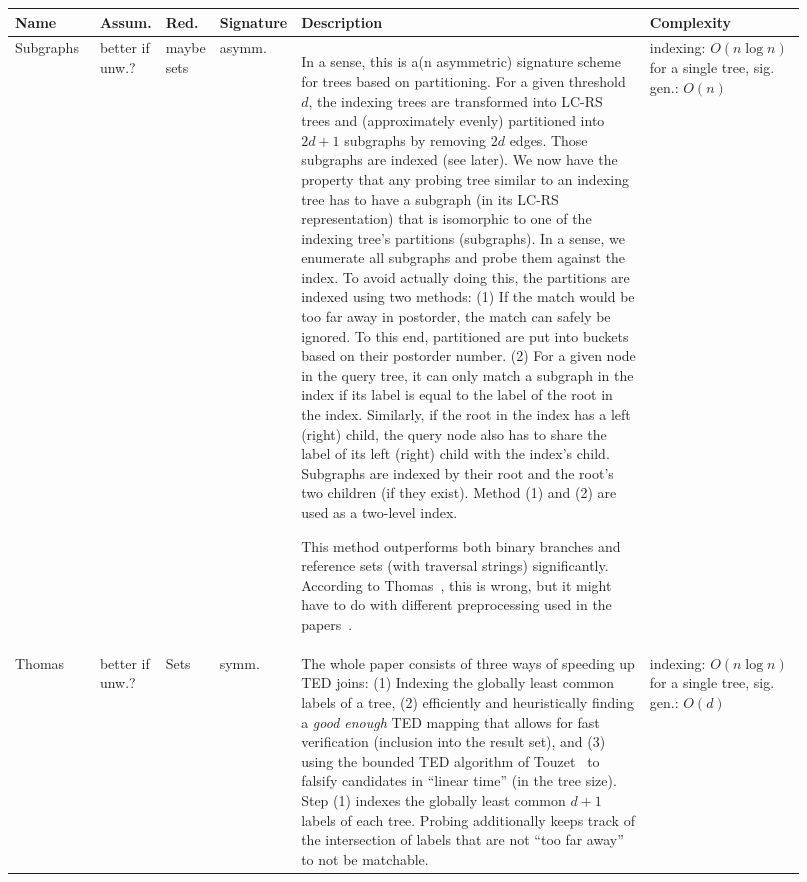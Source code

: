 \documentclass{article}
\begin{document}
\begin{footnotesize}
    \begin{longtable}[c]{p{0.1\linewidth}p{0.075\linewidth}p{0.05\linewidth}p{0.05\linewidth}p{0.45\linewidth}p{0.2\linewidth}}
        \toprule
        Name    &   Assum.  & Red.  &   Signature   &   Description  &   Complexity   \tabularnewline
        \midrule\endhead
        Subgraphs~\cite{DBLP:journals/pvldb/TangCM15}&
        better if unw.?&
        maybe sets&
        asymm.&
        In a sense, this is a(n asymmetric) signature scheme for trees based on partitioning. For a given threshold $d$, the indexing trees are transformed into LC-RS trees and (approximately evenly) partitioned into $2d+1$ subgraphs by removing $2d$ edges. Those subgraphs are indexed (see later). We now have the property that any probing tree similar to an indexing tree has to have a subgraph (in its LC-RS representation) that is isomorphic to one of the indexing tree's partitions (subgraphs). In a sense, we enumerate all subgraphs and probe them against the index. To avoid actually doing this, the partitions are indexed using two methods: (1) If the match would be too far away in postorder, the match can safely be ignored. To this end, partitioned are put into buckets based on their postorder number. (2) For a given node in the query tree, it can only match a subgraph in the index if its label is equal to the label of the root in the index. Similarly, if the root in the index has a left (right) child, the query node also has to share the label of its left (right) child with the index's child. Subgraphs are indexed by their root and the root's two children (if they exist). Method (1) and (2) are used as a two-level index.

        This method outperforms both binary branches and reference sets (with traversal strings) significantly. According to Thomas~\cite{DBLP:conf/icde/Hutter0LA19}, this is wrong, but it might have to do with different preprocessing used in the papers~\cite{DBLP:journals/dbsk/PawlikHKMA19}.&
        indexing: $O(n\log n)$ for a single tree, sig. gen.: $O(n)$
        \tabularnewline
        Thomas~\cite{DBLP:conf/icde/Hutter0LA19}&
        better if unw.?&
        Sets&
        symm.&
        The whole paper consists of three ways of speeding up TED joins: (1) Indexing the globally least common labels of a tree, (2) efficiently and heuristically finding a \textit{good enough} TED mapping that allows for fast verification (inclusion into the result set), and (3) using the bounded TED algorithm of Touzet~\cite{DBLP:conf/cpm/Touzet05} to falsify candidates in \enquote{linear time} (in the tree size). Step (1) indexes the globally least common $d+1$ labels of each tree. Probing additionally keeps track of the intersection of labels that are not \enquote{too far away} to not be matchable.&
        indexing: $O(n\log n)$ for a single tree, sig. gen.: $O(d)$
        \tabularnewline
        \bottomrule
    \end{longtable}
\end{footnotesize}

\clearpage
\printbibliography
\end{document}
